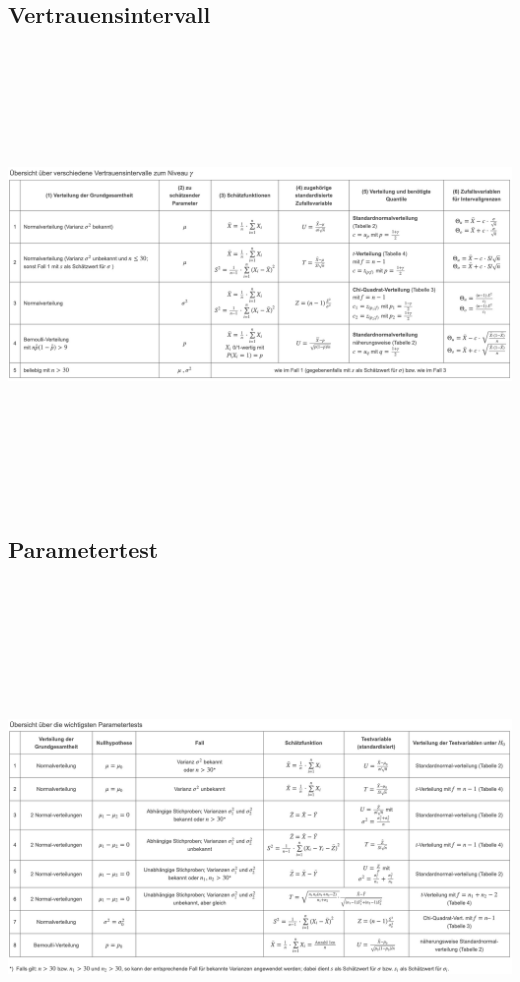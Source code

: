 \documentclass[8pt,a4paper]{scrartcl}
\begin{document}
\subsection{Vertrauensintervall}
\includegraphics[height=12cm]{img/Vertrauensintervall.png}
\subsection{Parametertest}
\includegraphics[height=14cm]{img/Parametertest.png} 
\end{document}
